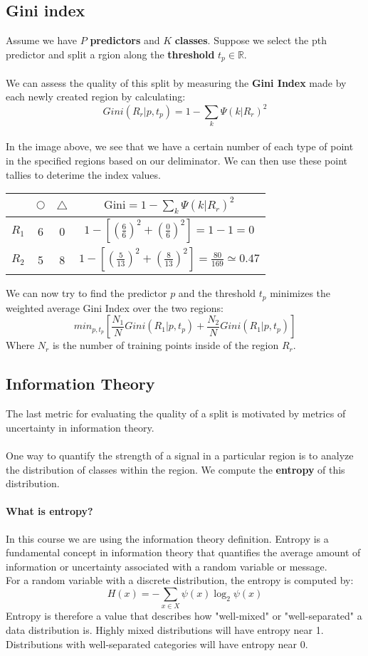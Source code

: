 \documentclass[11pt,a4paper]{report}
\begin{document}
\subsection{Gini index}
Assume we have $P$ \textbf{predictors} and $K$ \textbf{classes}. Suppose we select the pth predictor and split a rgion along the \textbf{threshold} $t_p\in\mathbb{R}$.\\\\We can assess the quality of this split by measuring the \textbf{Gini Index} made by each newly created region by calculating:
$$Gini(R_r|p,t_p) = 1 - \sum_{k}\Psi(k|R_r)^2 $$
\\
In the image above, we see that we have a certain number of each type of point in the specified regions based on our deliminator. We can then use these point tallies to deterime the index values.\\
\begin{center}
\begin{tabular}{ |c|c|c|c| } 
 \hline
  & $\bigcirc$ & $\triangle$ & $\textrm{Gini}= 1-\sum_k\Psi(k|R_r)^2$\\\hline\hline
 $R_1$ & 6 & 0 & $1 - \left[\left(\frac{6}{6}\right)^2 + \left(\frac{0}{6}\right)^2 \right] = 1-1=0$\\\hline
 $R_2$ & 5 & 8 & $1 - \left[\left(\frac{5}{13}\right)^2 + \left(\frac{8}{13}\right)^2 \right] = \frac{80}{169} \simeq 0.47$\\\hline
\end{tabular}
\end{center}
We can now try to find the predictor $p$ and the threshold $t_p$ minimizes the weighted average Gini Index over the two regions:$$min_{p,t_p}\left[\frac{N_1}{N}Gini(R_1|p,t_p)+\frac{N_2}{N}Gini(R_1|p,t_p)\right]$$Where $N_r$ is the number of training points inside of the region $R_r$.
\subsection{Information Theory}
The last metric for evaluating the quality of a split is motivated by metrics of uncertainty in information theory.\\\\One way to quantify the strength of a signal in a particular region is to analyze the distribution of classes within the region. We compute the \textbf{entropy} of this distribution.
\paragraph{What is entropy?}In this course we are using the information theory definition. Entropy is a fundamental concept in information theory that quantifies the average amount of information or uncertainty associated with a random variable or message.\\For a random variable with a discrete distribution, the entropy is computed by:
$$H(x) = - \sum_{x\in X}\psi(x)\log_2\psi(x)$$
Entropy is therefore a value that describes how "well-mixed" or "well-separated" a data distribution is. Highly mixed distributions will have entropy near 1. Distributions with well-separated categories will have entropy near 0.
\end{document}
